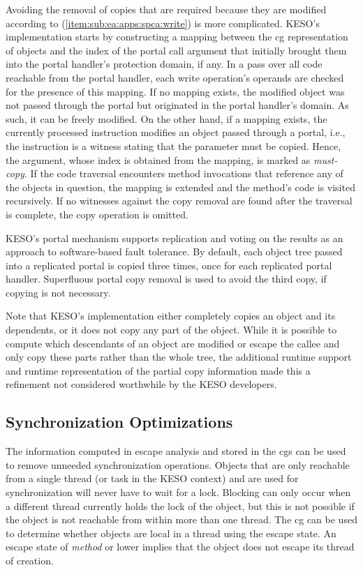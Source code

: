 			Avoiding the removal of copies that are required because they are modified according to
			(\ref{item:sub:ea:apps:spca:write}) is more complicated. KESO's implementation starts by constructing a mapping
			between the \gls{cg} representation of objects and the index of the portal call argument that initially brought
			them into the portal handler's protection domain, if any. In a pass over all code reachable from the portal
			handler, each write operation's operands are checked for the presence of this mapping. If no mapping exists, the
			modified object was not passed through the portal but originated in the portal handler's domain. As such, it can
			be freely modified. On the other hand, if a mapping exists, the currently processed instruction modifies an object
			passed through a portal, i.e., the instruction is a witness stating that the parameter must be copied. Hence, the
			argument, whose index is obtained from the mapping, is marked as \emph{must-copy}. If the code traversal
			encounters method invocations that reference any of the objects in question, the mapping is extended and the
			method's code is visited recursively. If no witnesses against the copy removal are found after the traversal is
			complete, the copy operation is omitted.

			KESO's portal mechanism supports replication and voting on the results as an approach to software-based fault
			tolerance. By default, each object tree passed into a replicated portal is copied three times, once for each
			replicated portal handler. Superfluous portal copy removal is used to avoid the third copy, if copying is not
			necessary.

			Note that KESO's implementation either completely copies an object and its dependents, or it does not copy any
			part of the object. While it is possible to compute which descendants of an object are modified or escape the
			callee and only copy these parts rather than the whole tree, the additional runtime support and runtime
			representation of the partial copy information made this a refinement not considered worthwhile by the KESO
			developers.

		\subsection{Synchronization Optimizations}
			\label{sub:ea:apps:sync}
			The information computed in escape analysis and stored in the \glspl{cg} can be used to remove unneeded
			synchronization operations. Objects that are only reachable from a single thread (or task in the KESO context) and
			are used for synchronization will never have to wait for a lock. Blocking can only occur when a different thread
			currently holds the lock of the object, but this is not possible if the object is not reachable from within more
			than one thread. The \acrlong{cg} can be used to determine whether objects are local in a thread using the escape
			state. An escape state of \emph{method} or lower implies that the object does not escape its thread of creation.

